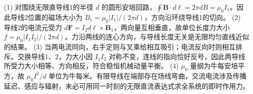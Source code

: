 (1) 对围绕无限直导线1的半径 \(d\) 的圆形安培回路，\(\oint\mathbf B\cdot d\boldsymbol\ell=2\pi d B=\mu_0I_1\)。因此导线2位置的磁场大小为 \(B_1=\mu_0|I_1|/(2\pi d)\)，方向沿环绕导线1的切向。
(2) 导线2的电流元受力 \(d\mathbf F=I_2d\boldsymbol\ell\times\mathbf B_1\)，两向量互相垂直，故单位长度力大小 \(f=\mu_0|I_1I_2|/(2\pi d)\)。力沿两线的连心方向，与导线长度无关是无限均匀直线近似的结果。
(3) 当两电流同向，右手定则与叉乘给相互吸引；电流反向时则相互排斥。交换导线1、2，力大小因 \(I_1I_2\) 对称不变，连线的指向恰好反号，因此两导线所受力大小相等、方向相反，符合稳恒机械动量平衡。
(4) \(\mu_0\) 量纲为牛每安培平方，故 \(\mu_0I^2/d\) 单位为牛每米。有限导线在端部存在场线弯曲，交流电流涉及传播延迟、感应与辐射，未必可用同一时刻的无限直流表达式求全系统的即时作用力。
